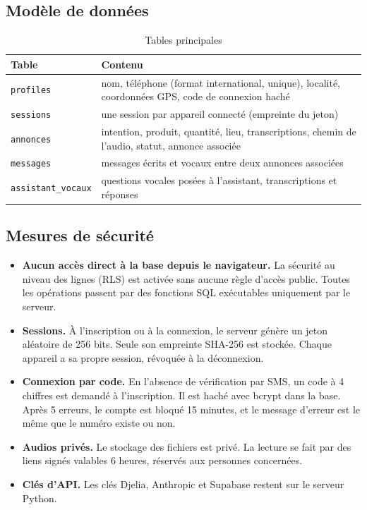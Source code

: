 \documentclass[12pt,a4paper]{article}
\begin{document}
\subsection{Modèle de données}

\begin{table}[h]
\centering
\begin{tabularx}{\textwidth}{lL}
\toprule
Table & Contenu \\
\midrule
\texttt{profiles} & nom, téléphone (format international, unique), localité, coordonnées GPS, code de connexion haché \\
\texttt{sessions} & une session par appareil connecté (empreinte du jeton) \\
\texttt{annonces} & intention, produit, quantité, lieu, transcriptions, chemin de l'audio, statut, annonce associée \\
\texttt{messages} & messages écrits et vocaux entre deux annonces associées \\
\texttt{assistant\_vocaux} & questions vocales posées à l'assistant, transcriptions et réponses \\
\bottomrule
\end{tabularx}
\caption{Tables principales}
\end{table}

\subsection{Mesures de sécurité}

\begin{itemize}
  \item \textbf{Aucun accès direct à la base depuis le navigateur.} La sécurité au niveau des lignes
  (RLS) est activée sans aucune règle d'accès public. Toutes les opérations passent par des fonctions
  SQL exécutables uniquement par le serveur.
  \item \textbf{Sessions.} À l'inscription ou à la connexion, le serveur génère un jeton aléatoire de
  256 bits. Seule son empreinte SHA-256 est stockée. Chaque appareil a sa propre session, révoquée
  à la déconnexion.
  \item \textbf{Connexion par code.} En l'absence de vérification par SMS, un code à 4 chiffres est
  demandé à l'inscription. Il est haché avec bcrypt dans la base. Après 5 erreurs, le compte est
  bloqué 15 minutes, et le message d'erreur est le même que le numéro existe ou non.
  \item \textbf{Audios privés.} Le stockage des fichiers est privé. La lecture se fait par des liens
  signés valables 6 heures, réservés aux personnes concernées.
  \item \textbf{Clés d'API.} Les clés Djelia, Anthropic et Supabase restent sur le serveur Python.
\end{itemize}
\end{document}
